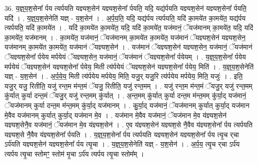 \documentclass[17pt]{extarticle}
\begin{document}
36. य॒ज्ञ्॒य॒श॒सेना᳚ र्पय त्यर्पयति यज्ञ्यश॒सेन॑ यज्ञ्यश॒सेना᳚ र्पयति॒ यदि॒ यद्य॑र्पयति यज्ञ्यश॒सेन॑ यज्ञ्यश॒सेना᳚ र्पयति॒ यदि॑ । . य॒ज्ञ्॒य॒श॒सेनेति॑ यज्ञ् - य॒श॒सेन॑ । . अ॒र्प॒य॒ति॒ यदि॒ यद्य॑र्पय त्यर्पयति॒ यदि॑ का॒मये॑त का॒मये॑त॒ यद्य॑र्पय त्यर्पयति॒ यदि॑ का॒मये॑त । . यदि॑ का॒मये॑त का॒मये॑त॒ यदि॒ यदि॑ का॒मये॑त॒ यज॑मानं॒ ॅयज॑मानम् का॒मये॑त॒ यदि॒ यदि॑ का॒मये॑त॒ यज॑मानम् । . का॒मये॑त॒ यज॑मानं॒ ॅयज॑मानम् का॒मये॑त का॒मये॑त॒ यज॑मानं ॅयज्ञ्यश॒सेन॑ यज्ञ्यश॒सेन॒ यज॑मानम् का॒मये॑त का॒मये॑त॒ यज॑मानं ॅयज्ञ्यश॒सेन॑ । . यज॑मानं ॅयज्ञ्यश॒सेन॑ यज्ञ्यश॒सेन॒ यज॑मानं॒ ॅयज॑मानं ॅयज्ञ्यश॒सेना᳚ र्पयेय मर्पयेयं ॅयज्ञ्यश॒सेन॒ यज॑मानं॒ ॅयज॑मानं ॅयज्ञ्यश॒सेना᳚ र्पयेयम् । . य॒ज्ञ्॒य॒श॒सेना᳚ र्पयेय मर्पयेयं ॅयज्ञ्यश॒सेन॑ यज्ञ्यश॒सेना᳚ र्पयेय॒ मिती त्य॑र्पयेयं ॅयज्ञ्यश॒सेन॑ यज्ञ्यश॒सेना᳚ र्पयेय॒ मिति॑ । . य॒ज्ञ्॒य॒श॒सेनेति॑ यज्ञ् - य॒श॒सेन॑ । . अ॒र्प॒ये॒य॒ मिती त्य॑र्पयेय मर्पयेय॒ मिति॒ यजु॒र् यजु॒रि त्य॑र्पयेय मर्पयेय॒ मिति॒ यजुः॑ । . इति॒ यजु॒र् यजु॒ रितीति॒ यजु॑ रन्त॒म म॑न्त॒मं ॅयजु॒ रितीति॒ यजु॑ रन्त॒मम् । . यजु॑ रन्त॒म म॑न्त॒मं ॅयजु॒र् यजु॑ रन्त॒मम् कु॑र्यात् कुर्या दन्त॒मं ॅयजु॒र् यजु॑ रन्त॒मम् कु॑र्यात् । . अ॒न्त॒मम् कु॑र्यात् कुर्या दन्त॒म म॑न्त॒मम् कु॑र्या॒द् यज॑मानं॒ ॅयज॑मानम् कुर्या दन्त॒म म॑न्त॒मम् कु॑र्या॒द् यज॑मानम् । . कु॒र्या॒द् यज॑मानं॒ ॅयज॑मानम् कुर्यात् कुर्या॒द् यज॑मान मे॒वैव यज॑मानम् कुर्यात् कुर्या॒द् यज॑मान मे॒व । . यज॑मान मे॒वैव यज॑मानं॒ ॅयज॑मान मे॒व य॑ज्ञ्यश॒सेन॑ यज्ञ्यश॒सेनै॒व यज॑मानं॒ ॅयज॑मान मे॒व य॑ज्ञ्यश॒सेन॑ । . ए॒व य॑ज्ञ्यश॒सेन॑ यज्ञ्यश॒से नै॒वैव य॑ज्ञ्यश॒सेना᳚ र्पय त्यर्पयति यज्ञ्यश॒से नै॒वैव य॑ज्ञ्यश॒सेना᳚ र्पयति । . य॒ज्ञ्॒य॒श॒सेना᳚ र्पय त्यर्पयति यज्ञ्यश॒सेन॑ यज्ञ्यश॒सेना᳚ र्पय त्यृ॒च र्‌चा ऽर्प॑यति यज्ञ्यश॒सेन॑ यज्ञ्यश॒सेना᳚ र्पय त्यृ॒चा । . य॒ज्ञ्॒य॒श॒सेनेति॑ यज्ञ् - य॒श॒सेन॑ । . अ॒र्प॒य॒ त्यृ॒च र्‌चा ऽर्प॑य त्यर्पय त्यृ॒चा स्तोमꣳ॒॒ स्तोम॑ मृ॒चा ऽर्प॑य त्यर्पय त्यृ॒चा स्तोम᳚म् । \newline
\end{document}
